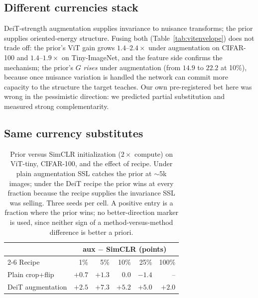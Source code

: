 \subsection{Different currencies stack}\label{sec:stack}
DeiT-strength augmentation supplies invariance to nuisance transforms;
the prior supplies oriented-energy structure. Fusing both
(Table~\ref{tab:vitenvelope}) does not trade off: the prior's ViT gain
grows $1.4$--$2.4\times$ under augmentation on CIFAR-100 and
$1.4$--$1.9\times$ on Tiny-ImageNet, and the feature side confirms the
mechanism; the prior's $G$ \emph{rises} under augmentation (from
$14.9$ to $22.2$ at 10\%), because once nuisance variation is handled the
network can commit more capacity to the structure the target teaches. Our
own pre-registered bet here was wrong in the pessimistic direction: we
predicted partial substitution and measured strong complementarity.

\subsection{Same currency substitutes}\label{sec:substitute}
\begin{table}[t]
\caption{Prior versus SimCLR initialization ($2\times$ compute) on
ViT-tiny, CIFAR-100, and the effect of recipe. Under plain augmentation
SSL catches the prior at ${\sim}5$k images; under the DeiT recipe the
prior wins at every fraction because the recipe supplies the invariance
SSL was selling. Three seeds per cell. A positive entry is a fraction
where the prior wins; no better-direction marker is used, since neither
sign of a method-versus-method difference is better a priori.}
\label{tab:flip}
\centering\scriptsize
\setlength{\tabcolsep}{2.6pt}
\begin{tabular}{@{}lrrrrr@{}}
\toprule
 & \multicolumn{5}{c}{aux $-$ SimCLR (points)} \\
\cmidrule(l){2-6}
Recipe & 1\% & 5\% & 10\% & 25\% & 100\% \\
\midrule
Plain crop+flip & $+0.7$ & $+1.3$ & $0.0$ & $-1.4$ &-- \\
DeiT augmentation & $+2.5$ & $+7.3$ & $+5.2$ & $+5.0$ & $+2.0$ \\
\bottomrule
\end{tabular}
\end{table}

